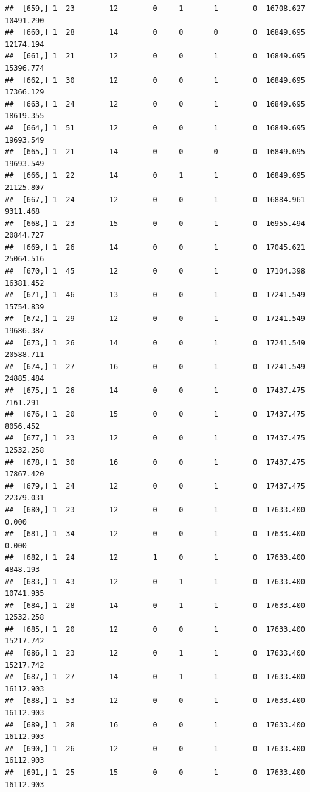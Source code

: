 \documentclass[
]{article}
\begin{document}
\begin{verbatim}
##  [659,] 1  23        12        0     1       1        0  16708.627  10491.290
##  [660,] 1  28        14        0     0       0        0  16849.695  12174.194
##  [661,] 1  21        12        0     0       1        0  16849.695  15396.774
##  [662,] 1  30        12        0     0       1        0  16849.695  17366.129
##  [663,] 1  24        12        0     0       1        0  16849.695  18619.355
##  [664,] 1  51        12        0     0       1        0  16849.695  19693.549
##  [665,] 1  21        14        0     0       0        0  16849.695  19693.549
##  [666,] 1  22        14        0     1       1        0  16849.695  21125.807
##  [667,] 1  24        12        0     0       1        0  16884.961   9311.468
##  [668,] 1  23        15        0     0       1        0  16955.494  20844.727
##  [669,] 1  26        14        0     0       1        0  17045.621  25064.516
##  [670,] 1  45        12        0     0       1        0  17104.398  16381.452
##  [671,] 1  46        13        0     0       1        0  17241.549  15754.839
##  [672,] 1  29        12        0     0       1        0  17241.549  19686.387
##  [673,] 1  26        14        0     0       1        0  17241.549  20588.711
##  [674,] 1  27        16        0     0       1        0  17241.549  24885.484
##  [675,] 1  26        14        0     0       1        0  17437.475   7161.291
##  [676,] 1  20        15        0     0       1        0  17437.475   8056.452
##  [677,] 1  23        12        0     0       1        0  17437.475  12532.258
##  [678,] 1  30        16        0     0       1        0  17437.475  17867.420
##  [679,] 1  24        12        0     0       1        0  17437.475  22379.031
##  [680,] 1  23        12        0     0       1        0  17633.400      0.000
##  [681,] 1  34        12        0     0       1        0  17633.400      0.000
##  [682,] 1  24        12        1     0       1        0  17633.400   4848.193
##  [683,] 1  43        12        0     1       1        0  17633.400  10741.935
##  [684,] 1  28        14        0     1       1        0  17633.400  12532.258
##  [685,] 1  20        12        0     0       1        0  17633.400  15217.742
##  [686,] 1  23        12        0     1       1        0  17633.400  15217.742
##  [687,] 1  27        14        0     1       1        0  17633.400  16112.903
##  [688,] 1  53        12        0     0       1        0  17633.400  16112.903
##  [689,] 1  28        16        0     0       1        0  17633.400  16112.903
##  [690,] 1  26        12        0     0       1        0  17633.400  16112.903
##  [691,] 1  25        15        0     0       1        0  17633.400  16112.903

\end{verbatim}
\end{document}
